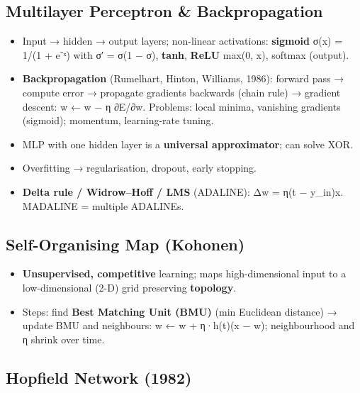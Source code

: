 \needspace{95pt}

\hypertarget{p2-10--103-multilayer-perceptron--backpropagation}{%
\subsection{Multilayer Perceptron \& Backpropagation}\label{p2-10--103-multilayer-perceptron--backpropagation}}



\begin{itemize}
\tightlist
\item
  Input → hidden → output layers; non-linear activations: \textbf{sigmoid} σ(x) = 1/(1 + e⁻ˣ) with σ′ = σ(1 − σ), \textbf{tanh}, \textbf{ReLU} max(0, x), softmax (output).
\item
  \textbf{Backpropagation} (Rumelhart, Hinton, Williams, 1986): forward pass → compute error → propagate gradients backwards (chain rule) → gradient descent: w ← w − η ∂E/∂w. Problems: local minima, vanishing gradients (sigmoid); momentum, learning-rate tuning.
\item
  MLP with one hidden layer is a \textbf{universal approximator}; can solve XOR.
\item
  Overfitting → regularisation, dropout, early stopping.
\item
  \textbf{Delta rule / Widrow--Hoff / LMS} (ADALINE): Δw = η(t − y\_in)x. MADALINE = multiple ADALINEs.
\end{itemize}

\needspace{95pt}

\hypertarget{p2-10--104-self-organising-map-kohonen}{%
\subsection{Self-Organising Map (Kohonen)}\label{p2-10--104-self-organising-map-kohonen}}

\begin{itemize}
\tightlist
\item
  \textbf{Unsupervised, competitive} learning; maps high-dimensional input to a low-dimensional (2-D) grid preserving \textbf{topology}.
\item
  Steps: find \textbf{Best Matching Unit (BMU)} (min Euclidean distance) → update BMU and neighbours: w ← w + η·h(t)(x − w); neighbourhood and η shrink over time.
\end{itemize}

\needspace{95pt}

\hypertarget{p2-10--105-hopfield-network-1982}{%
\subsection{Hopfield Network (1982)}\label{p2-10--105-hopfield-network-1982}}

